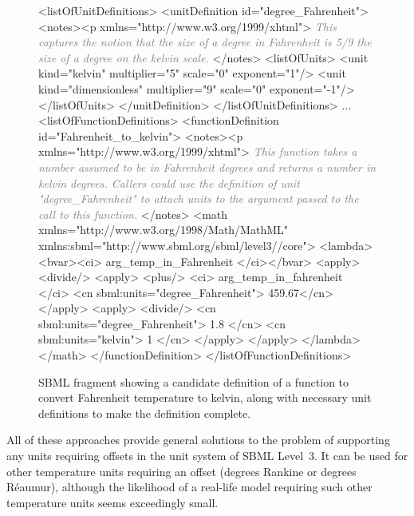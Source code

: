 \begin{figure}
  \begin{example}
<listOfUnitDefinitions>
    <unitDefinition id="degree_Fahrenheit">
        <notes><p xmlns="http://www.w3.org/1999/xhtml">
            \textcolor{gray}{\emph{This captures the notion that the size of a degree in Fahrenheit is 5/9 the size
            of a degree on the kelvin scale.}}
        </notes>
        <listOfUnits>
            <unit kind="kelvin"        multiplier="5" scale="0" exponent="1"/>
            <unit kind="dimensionless" multiplier="9" scale="0" exponent="-1"/>
        </listOfUnits>
    </unitDefinition>
</listOfUnitDefinitions>
...
<listOfFunctionDefinitions>
    <functionDefinition id="Fahrenheit_to_kelvin">
        <notes><p xmlns="http://www.w3.org/1999/xhtml">
            \textcolor{gray}{\emph{This function takes a number assumed to be in Fahrenheit degrees and returns a number
            in kelvin degrees.  Callers could use the definition of unit "degree_Fahrenheit" to
            attach units to the argument passed to the call to this function.}} 
        </notes>
        <math xmlns="http://www.w3.org/1998/Math/MathML"
              xmlns:sbml="http://www.sbml.org/sbml/level3//core">
            <lambda>
                <bvar><ci> arg_temp_in_Fahrenheit </ci></bvar>
                <apply>
                    <divide/>
                    <apply>
                        <plus/>
                        <ci> arg_temp_in_fahrenheit </ci>
                        <cn sbml:units="degree_Fahrenheit"> 459.67</cn>
                    </apply>
                    <apply>
                        <divide/>
                        <cn sbml:units="degree_Fahrenheit"> 1.8 </cn>
                        <cn sbml:units="kelvin"> 1 </cn>
                    </apply>
                </apply>
            </lambda>
        </math>
    </functionDefinition>
</listOfFunctionDefinitions>
\end{example}
\caption{SBML fragment showing a candidate definition of a
  function to convert Fahrenheit temperature to kelvin, along with
  necessary unit definitions to make the definition complete.}
    \label{fig:ftok}
\vspace*{-1em}
\end{figure}

All of these approaches provide general solutions to the problem
of supporting any units requiring offsets in the unit system of
SBML Level~3.  It can be used for other temperature units
requiring an offset (\eg degrees Rankine or degrees R\'{e}aumur),
although the likelihood of a real-life model requiring such other
temperature units seems exceedingly small.


